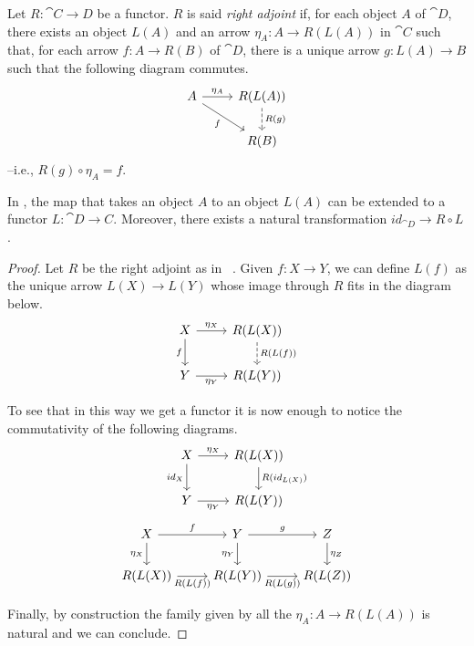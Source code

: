 \begin{definition}\label{def:right_adjoint}
    Let $R: \cat{C \rightarrow D}$ be a functor. $R$ is said \emph{right adjoint} if, for each object $A$ of $\cat D$, there exists an object $L(A)$ and an arrow $\eta_A:A \rightarrow R(L(A))$ in $\cat C$ such that, for each arrow $f: A \rightarrow R(B)$ of $\cat D$, there is a unique arrow $g:L(A) \rightarrow B$ such that the following diagram commutes.
    \[
        \begin{tikzcd}
            A \arrow[r, "{\eta_A}"] \arrow[dr, "f" swap] & R(L(A)) \arrow[d, dashed, "R(g)"] \\
            & R(B)
        \end{tikzcd}
    \]
    --i.e., $R(g) \circ \eta_A = f$.
\end{definition}

\begin{prop}\label{prop:ext_left_to_funct}
    In , the map that takes an object $A$ to an object $L(A)$ can be extended to a functor $L: \cat{D \rightarrow C}$. Moreover, there exists a natural transformation $id_{\cat{D}}\to R\circ L$.
\end{prop}
\begin{proof}
    Let $R$ be the right adjoint as in ~. Given $f\colon X \rightarrow Y$, we can define $L(f)$ as the unique arrow  $L(X) \rightarrow L(Y)$ whose image through $R$ fits in the diagram below.
    \[
    \begin{tikzcd}
    	X \arrow[r, "{\eta_X}"] \arrow[d, "f" swap] & R(L(X)) \arrow[d, dashed, "R(L(f))"] \\
    	Y\arrow[r, "\eta_Y" swap]& R(L(Y))
    \end{tikzcd}
    \]
    
    To see that in this way we get a functor it is now enough to notice the commutativity of the following diagrams.
    \[
    \begin{tikzcd}
    	X \arrow[r, "{\eta_X}"] \arrow[d, "{id_X}" swap] & R(L(X)) \arrow[d, "{R(id_{L(X)})}"]   \\
    	Y\arrow[r, "{\eta_Y}" swap] & R(L(Y))
    \end{tikzcd}
    \]    \[
    \begin{tikzcd}
    	   X \arrow[d, "{\eta_X}" swap]  \arrow[r, "{f}"]& Y \arrow[d, "{\eta_Y}" swap] \arrow[r, "{g}"]& Z\arrow[d, "{\eta_Z}"]\\
    	R(L(X))  \arrow[r, "{R(L(f))}" swap] & R(L(Y)) \arrow[r, "{R(L(g))}" swap] & R(L(Z))
    \end{tikzcd}
    \]
    
    Finally, by construction the family given by all the $\eta_A\colon A\to R(L(A))$ is natural and we can conclude. 
\end{proof}

